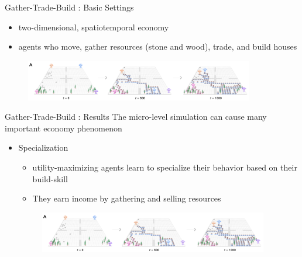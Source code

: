 \documentclass{beamer}
\begin{document}
    \begin{frame}{Gather-Trade-Build : Basic Settings}
        \begin{itemize}
            \item two-dimensional, spatiotemporal economy
            \item agents who move, gather resources (stone and wood), trade, and build houses
        \end{itemize}
        \begin{figure}[h]
            \includegraphics[width=10cm]{./img/pic3.png}
        \end{figure}
        
    \end{frame}

    \begin{frame}{Gather-Trade-Build : Results}
        The micro-level simulation can cause many important economy phenomenon
        \begin{itemize}
            \item Specialization
                \begin{itemize}
                    \item utility-maximizing agents learn to specialize their behavior based on their build-skill
                    \item They earn income by gathering and selling resources
                \end{itemize}
            \begin{figure}[h]
                \includegraphics[width=10cm]{./img/pic3.png}
            \end{figure}

        \end{itemize}
    \end{frame}
\end{document}

